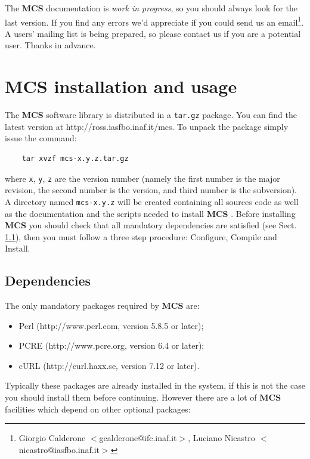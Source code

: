 \documentclass[12pt,titlepage]{article}
\newcommand{\mcs}{\textbf{MCS} }
\def\url{http://ross.iasfbo.inaf.it/mcs}
\begin{document}
\smallskip
\noindent
The \mcs documentation is \emph{work in progress}, so you should
always look for the last version. If you find any errors we'd
appreciate if you could send us an email\footnote{Giorgio Calderone
  $<$gcalderone@ifc.inaf.it$>$, Luciano Nicastro
  $<$nicastro@iasfbo.inaf.it$>$}. A users' mailing list is being
prepared, so please contact us if you are a potential user. Thanks in
advance.

%
\newpage
\section{\mcs installation and usage}
The \mcs software library is distributed in a \verb|tar.gz| package.
You can find the latest version at \textsf{\url}. To unpack the package simply
issue the command:
%
\begin{verbatim}
    tar xvzf mcs-x.y.z.tar.gz
\end{verbatim}
%
where \verb|x|, \verb|y|, \verb|z| are the version number (namely the
first number is the major revision, the second number is the version,
and third number is the subversion). A directory named
\verb|mcs-x.y.z| will be created containing all sources code as well
as the documentation and the scripts needed to install \mcs. Before
installing \mcs you should check that all mandatory dependencies are
satisfied (see Sect. \ref{sec:Dependencies}), then you must follow a
three step procedure: Configure, Compile and Install.

\subsection{Dependencies}
\label{sec:Dependencies}
The only mandatory packages required by \mcs are:

\begin{itemize}
\item Perl (http://www.perl.com, version 5.8.5 or later);
\item PCRE (http://www.pcre.org, version 6.4 or later);
\item cURL (http://curl.haxx.se, version 7.12 or later).
\end{itemize}

\noindent
Typically these packages are already installed in the system, if this
is not the case you should install them before continuing. However
there are a lot of \mcs facilities which depend on other optional
packages:
\end{document}
